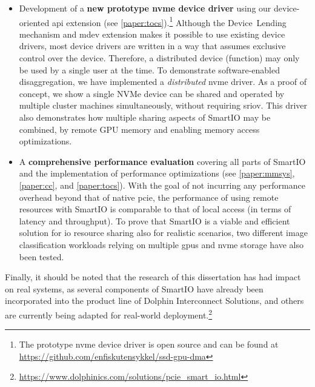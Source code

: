 \begin{itemize}
    \item Development of a \textbf{new prototype \gls{nvme} device driver} using our device-oriented \gls{api} extension (see \cref{paper:tocs}).\footnote{The prototype \gls{nvme} device driver is open source and can be found at \mbox{\url{https://github.com/enfiskutensykkel/ssd-gpu-dma}}}
    Although the Device~Lending mechanism and \gls{mdev} extension makes it possible to use existing device drivers, most device drivers are written in a way that assumes exclusive control over the device. Therefore, a distributed device (function) may only be used by a single user at the time.
    To demonstrate software-enabled \gls{disaggregation}, we have implemented a \emph{distributed} \gls{nvme} driver. As a proof of concept, we show a single NVMe device can be shared and operated by multiple cluster machines simultaneously, without requiring \gls{sriov}.
	This driver also demonstrates how multiple sharing aspects of SmartIO may be combined, 
	by  remote GPU memory and enabling memory access optimizations.

    \item A \textbf{comprehensive performance evaluation} covering all parts of SmartIO and the implementation of performance optimizations (see \cref{paper:mmsys}, \cref{paper:cc}, and \cref{paper:tocs}). With the goal of not incurring any performance overhead beyond that of native \gls{pcie}, the performance of using remote resources with SmartIO is comparable to that of local access (in terms of latency and throughput).
        To prove that SmartIO is a viable and efficient solution for \gls{io} resource sharing also for realistic scenarios, two different image classification workloads relying on multiple \glspl{gpu} and \gls{nvme} storage have also been tested.
	
\end{itemize}
%
Finally, it should be noted that the research of this dissertation has had impact on real systems, as several components of SmartIO have already been incorporated into the product line of Dolphin Interconnect Solutions, and others are currently being adapted for real-world deployment.\footnote{{\url{https://www.dolphinics.com/solutions/pcie_smart_io.html}}}


